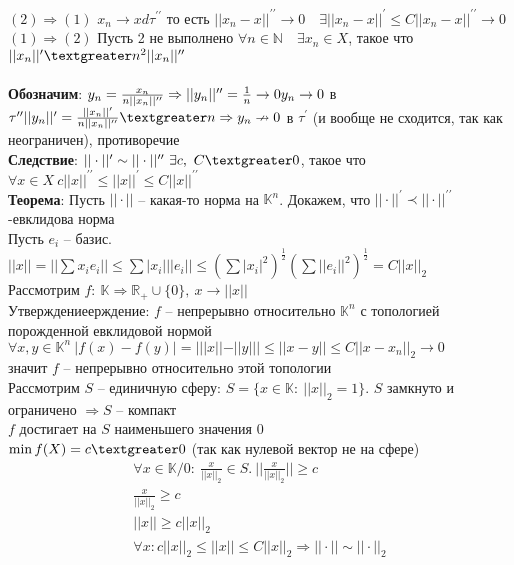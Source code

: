 	$(2) \Rightarrow (1)$ $x_n \to x d \tau^{\prime \prime}$ то есть $||x_n - x||^{\prime \prime} \to 0\quad \exists ||x_n - x||^{\prime} \leqslant C||x_n - x||^{\prime \prime} \to 0$\\
	$(1) \Rightarrow (2)$ Пусть 2 не выполнено $\forall n \in \mathbb{N}\quad \exists x_n \in X$, такое что $||x_n||^{\prime} \textgreater n^2 ||x_n||^{\prime \prime}$\\
	\\
	\textbf{Обозначим}: $y_n = \frac{x_n}{n||x_n||^{\prime \prime}} \Rightarrow ||y_n||^{\prime \prime}=\frac{1}{n} \to 0\\
	y_n \to 0$ в $\tau^{\prime \prime}\\
	||y_n||^{\prime}=\frac{||x_n||^{\prime}}{n||x_n||^{\prime \prime}} \textgreater n \Rightarrow y_n \nrightarrow 0$ в $\tau^{\prime}$ (и вообще не сходится, так как неограничен), противоречие\\
	\textbf{Следствие}: $||\cdot||^{\prime} \sim ||\cdot||^{\prime \prime}\ \exists c,\ C \textgreater 0$, такое что $\forall x\in X\ c||x||^{\prime \prime} \leqslant ||x||^{\prime} \leqslant C||x||^{\prime \prime}$\\
	\textbf{Теорема}: Пусть $||\cdot||$ -- какая-то норма на $\mathbb{K}^n$. Докажем, что $||\cdot||^{\prime} \prec ||\cdot||^{\prime \prime}$-евклидова норма\\
	Пусть $e_i$ -- базис. $||x|| = ||\sum x_i e_i|| \leqslant \sum |x_i| ||e_i|| \leqslant (\sum |x_i|^2)^{\frac{1}{2}} (\sum ||e_i||^2)^{\frac{1}{2}} = C ||x||_2$\\
	Рассмотрим $f:\ \mathbb{K} \Rightarrow \mathbb{R}_{+} \cup \{0\},\ x\to ||x||$\\
	Утверждениеерждение: $f$ -- непрерывно относительно $\mathbb{K}^n$ с топологией порожденной евклидовой нормой\\
	$\forall x,y \in \mathbb{K}^n\ |f(x)-f(y)|=|||x||-||y||| \leqslant ||x-y|| \leqslant C ||x-x_n||_2 \to 0$\\
	значит $f$ -- непрерывно относительно этой топологии\\
	Рассмотрим $S$ -- единичную сферу: $S=\{x\in \mathbb{K}:\ ||x||_2=1\}$. $S$ замкнуто и ограничено $\Rightarrow S$ -- компакт\\
	$f$ достигает на $S$ наименьшего значения $0$\\
	$\min f(X) = c\textgreater 0$ (так как нулевой вектор не на сфере)\\
	\begin{gather*}
	\forall x\in \mathbb{K} \slash 0:\ \frac{x}{||x||_2} \in S.\ ||\frac{x}{||x||_2}|| \geqslant c\\
	\frac{x}{||x||_2} \geqslant c\\
	||x|| \geqslant c||x||_2\\
	\forall x: c||x||_2 \leqslant ||x|| \leqslant C||x||_2 \Rightarrow ||\cdot|| \sim ||\cdot||_2
	\end{gather*}
